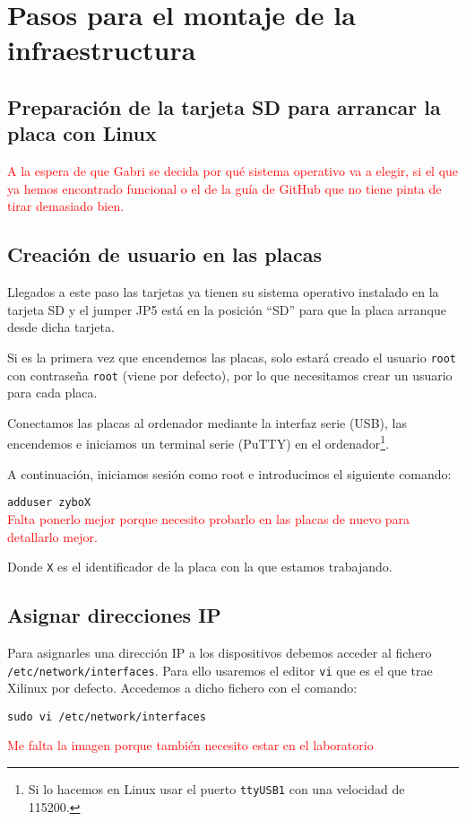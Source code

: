 \documentclass[12pt,letterpaper]{article}
\begin{document}
\section{Pasos para el montaje de la infraestructura}
\subsection{Preparación de la tarjeta SD para arrancar la placa con Linux}

\textcolor{red}{A la espera de que Gabri se decida por qué sistema operativo va a elegir, si el que ya hemos encontrado funcional o el de la guía de GitHub que no tiene pinta de tirar demasiado bien.}


\subsection{Creación de usuario en las placas}
Llegados a este paso las tarjetas ya tienen su sistema operativo instalado en la tarjeta SD y el jumper JP5 está en la posición ``SD'' para que la placa arranque desde dicha tarjeta.

Si es la primera vez que encendemos las placas, solo estará creado el usuario \texttt{root} con contraseña \texttt{root} (viene por defecto), por lo que necesitamos crear un usuario para cada placa.

Conectamos las placas al ordenador mediante la interfaz serie (USB), las encendemos e iniciamos un terminal serie (PuTTY) en el ordenador\footnote{Si lo hacemos en Linux usar el puerto \texttt{ttyUSB1} con una velocidad de 115200.}.

A continuación, iniciamos sesión como root e introducimos el siguiente comando:
\begin{center}
	\texttt{adduser zyboX}
\\	\textcolor{red}{Falta ponerlo mejor porque necesito probarlo en las placas de nuevo para detallarlo mejor.}
\end{center}
Donde \texttt{X} es el identificador de la placa con la que estamos trabajando.

\subsection{Asignar direcciones IP}
Para asignarles una dirección IP a los dispositivos debemos acceder al fichero\\ \texttt{/etc/network/interfaces}. Para ello usaremos el editor \texttt{vi} que es el que trae Xilinux por defecto. Accedemos a dicho fichero con el comando:
\begin{center}
	\texttt{sudo vi /etc/network/interfaces}
\end{center}
\textcolor{red}{Me falta la imagen porque también necesito estar en el laboratorio}
\end{document}
